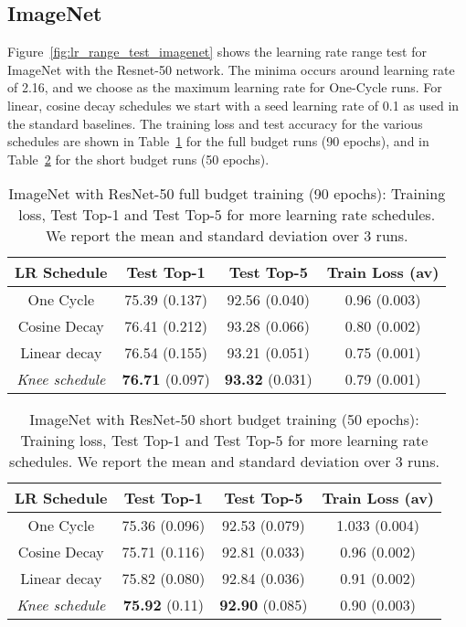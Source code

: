 \documentclass[twoside,11pt]{article}
\newcommand{\lrschedule}{\textit{Knee schedule}}
\begin{document}
\subsection{ImageNet}
Figure~\ref{fig:lr_range_test_imagenet} shows the learning rate range test for ImageNet with the Resnet-50 network. The minima occurs around learning rate of 2.16, and we choose  as the maximum learning rate for One-Cycle runs. For linear, cosine decay schedules we start with a seed learning rate of 0.1 as used in the standard baselines. The training loss and test accuracy for the various schedules are shown in Table~\ref{tab:ImageNet_full_budget_runs} for the full budget runs (90 epochs), and in Table~\ref{tab:ImageNet_short_budget_runs} for the short budget runs (50 epochs).

\begin{table}[h]
\small
\centering
\caption{ImageNet with ResNet-50 full budget training (90 epochs): Training loss, Test Top-1 and Test Top-5 for more learning rate schedules. We report the mean and standard deviation over 3 runs.}
\label{tab:ImageNet_full_budget_runs}
\begin{tabular}{cccc}
  \toprule
  LR Schedule    & Test Top-1  & Test Top-5  & Train Loss (av) \\ 
  \midrule
  One Cycle        & 75.39 (0.137) & 92.56 (0.040) & 0.96 (0.003) \\
  Cosine Decay      & 76.41 (0.212) & 93.28 (0.066) & 0.80 (0.002) \\
  Linear decay     &  76.54 (0.155) & 93.21 (0.051)  & 0.75 (0.001)\\
  \lrschedule{}     & \textbf{76.71} (0.097)  & \textbf{93.32} (0.031) & 0.79 (0.001) \\ \bottomrule
\end{tabular}

\end{table}
\begin{table}[h!]
\small
\centering
\caption{ImageNet with ResNet-50 short budget training (50 epochs): Training loss, Test Top-1 and Test Top-5 for more learning rate schedules. We report the mean and standard deviation over 3 runs.}
\label{tab:ImageNet_short_budget_runs}
\begin{tabular}{cccc}
  \toprule
  LR Schedule    & Test Top-1  & Test Top-5  & Train Loss (av) \\ 
  \midrule
  One Cycle        & 75.36 (0.096) & 92.53 (0.079) & 1.033 (0.004)\\
  Cosine Decay     & 75.71 (0.116) & 92.81 (0.033) & 0.96 (0.002) \\
  Linear decay     & 75.82 (0.080) & 92.84 (0.036) & 0.91 (0.002) \\
  \lrschedule{}    & \textbf{75.92} (0.11) & \textbf{92.90} (0.085) & 0.90 (0.003) \\
\bottomrule
\end{tabular}

\end{table}
\end{document}
